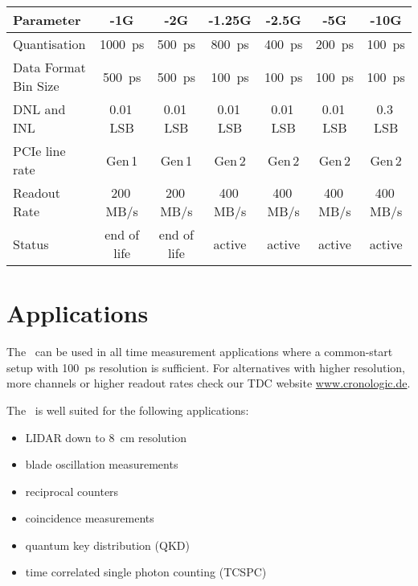 \noindent
\begin{tabularx}{\textwidth}{|X|c|c|c|c|c|c|}
    \hline
    Parameter & -1G & -2G & -1.25G & -2.5G & -5G & -10G\\
    \hline\hline
    Quantisation & \SI{1000}{\pico\second} & \SI{500}{\pico\second} & \SI{800}{\pico\second} & \SI{400}{\pico\second} & \SI{200}{\pico\second} & \SI{100}{\pico\second} \\
    \hline
    Data Format Bin Size & \SI{500}{\pico\second} & \SI{500}{\pico\second} & \SI{100}{\pico\second} & \SI{100}{\pico\second} & \SI{100}{\pico\second} & \SI{100}{\pico\second} \\
    \hline 
    DNL and INL & 0.01\,LSB & 0.01\,LSB & 0.01\,LSB & 0.01\,LSB & 0.01\,LSB & 0.3\,LSB \\
    \hline 
    PCIe line rate & Gen\,1 & Gen\,1 & Gen\,2 & Gen\,2 & Gen\,2 & Gen\,2\\  
    \hline 
    Readout Rate & 200\,MB/s & 200\,MB/s & 400\,MB/s & 400\,MB/s & 400\,MB/s & 400\,MB/s\\ 
    \hline 
    Status & end of life & end of life & active & active & active & active \\
    \hline
\end{tabularx}  

\section{Applications}
The \deviceName\  can be used in all time measurement applications where
a common-start setup with \SI{100}{\pico\second} resolution is sufficient. 
For alternatives with higher resolution, more channels or higher readout
rates check our TDC website
\href{https://www.cronologic.de/produkte/products-overview#tdcdata}{www.cronologic.de}.

The \deviceName\ is well suited for the following applications:
\begin{itemize}
    \item LIDAR down to \SI{8}{\centi\meter} resolution
    \item blade oscillation measurements
    \item reciprocal counters
    \item coincidence measurements
    \item quantum key distribution (QKD)
    \item time correlated single photon counting (TCSPC)
\end{itemize} 
